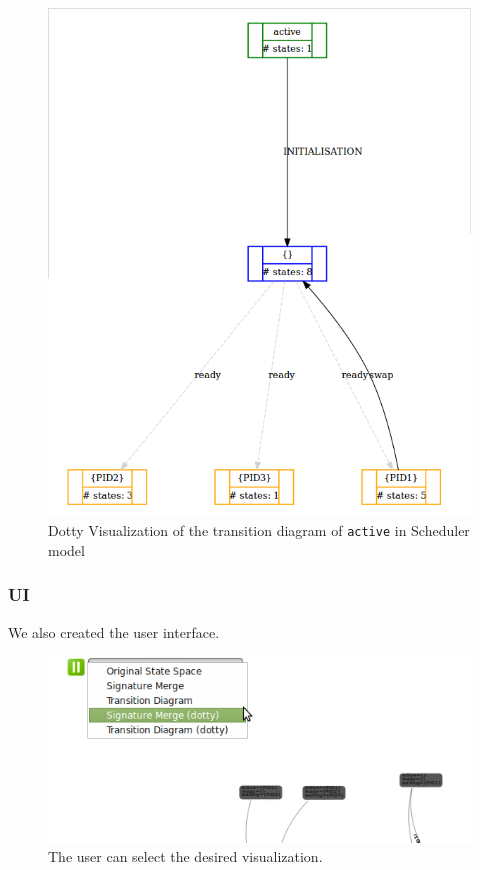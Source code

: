 \begin{figure}[h!]
\centering
\includegraphics[width=15cm]{bilder/transdiag-dotty-wo.png}
\caption{Dotty Visualization of the transition diagram of \texttt{active} in Scheduler model}
\label{transdiagDotty}
\end{figure}

\subsubsection{UI} 
We also created the user interface.

\begin{figure}[h!]
\centering
\includegraphics[width=15cm]{bilder/selectVisualization.png}
\caption{The user can select the desired visualization.}
\label{userSelect}
\end{figure}

